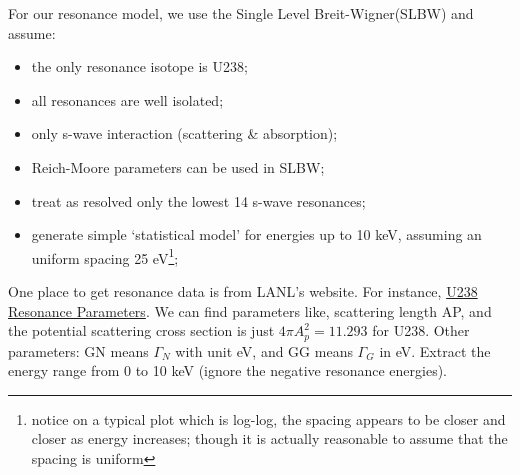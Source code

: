 \documentclass{school-22.211-notes}
\begin{document}
\clearpage
{}
For our resonance model, we use the Single Level Breit-Wigner(SLBW) and assume:
\begin{itemize}
  \item the only resonance isotope is U238;
  \item all resonances are well isolated;
  \item only s-wave interaction (scattering \& absorption);
  \item Reich-Moore parameters can be used in SLBW;
  \item treat as resolved only the lowest 14 s-wave resonances;
  \item generate simple `statistical model' for energies up to 10 keV, assuming an uniform spacing 25 eV\footnote{notice on a typical plot which is log-log, the spacing appears to be closer and closer as energy increases; though it is actually reasonable to assume that the spacing is uniform};
\end{itemize}

One place to get resonance data is from LANL's website. For instance, \href{http://t2.lanl.gov/cgi-bin/endf?2,151,/inet/WWW/data/data/ENDFB-VII-neutron/U/238}{U238 Resonance Parameters}. We can find parameters like, scattering length AP, and the potential scattering cross section is just $4 \pi A_p^2 = 11.293$ for U238. Other parameters: GN means $\Gamma_N$ with unit eV, and GG means $\Gamma_G$ in eV. Extract the energy range from 0 to 10 keV (ignore the negative resonance energies). 
\end{document}
